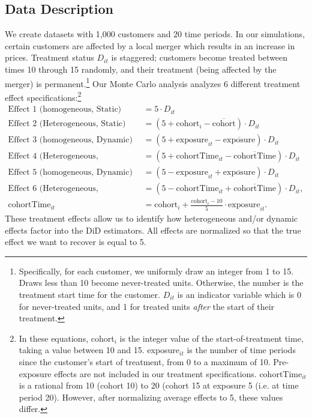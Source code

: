 \documentclass[12pt]{article}
\begin{document}
\subsection{Data Description}
We create datasets with 1,000 customers and 20 time periods. In our simulations, certain customers are affected by a local merger which results in an increase in prices. Treatment status $D_{it}$ is staggered; customers become treated between times 10 through 15 randomly, and their treatment (being affected by the merger) is permanent.\footnote{Specifically, for each customer, we uniformly draw an integer from 1 to 15. Draws less than 10 become never-treated units. Otherwise, the number is the treatment start time for the customer. $D_{it}$ is an indicator variable which is 0 for never-treated units, and 1 for treated units \textit{after} the start of their treatment.} Our Monte Carlo analysis analyzes 6 different treatment effect specifications:\footnote{In these equations, cohort$_i$ is the integer value of the start-of-treatment time, taking a value between 10 and 15. exposure$_{it}$ is the number of time periods since the customer's start of treatment, from 0 to a maximum of 10. Pre-exposure effects are not included in our treatment specifications. cohortTime$_{it}$ is a rational from 10 (cohort 10) to 20 (cohort 15 at exposure 5 (i.e. at time period 20). However, after normalizing average effects to 5, these values differ.}
\begin{align*}
    \text{Effect 1 (homogeneous, Static)} &= 5\cdot D_{it} \\
    \text{Effect 2 (Heterogeneous, Static)} &= (5 + \text{cohort}_i - \overline{\text{cohort}})\cdot D_{it} \\
    \text{Effect 3 (homogeneous, Dynamic)} &= (5 + \text{exposure}_{it} - \overline{\text{exposure}})\cdot D_{it} \\
    \text{Effect 4 (Heterogeneous, Dynamic)} &= (5 + \text{cohortTime}_{it} - \overline{\text{cohortTime}})\cdot D_{it} \\
    \text{Effect 5 (homogeneous, Dynamic)} &= (5 - \text{exposure}_{it} + \overline{\text{exposure}})\cdot D_{it} \\
    \text{Effect 6 (Heterogeneous, Dynamic)} &= (5 - \text{cohortTime}_{it} + \overline{\text{cohortTime}})\cdot D_{it}, \\
    \text{cohortTime}_{it} &= \text{cohort}_i + \frac{\text{cohort}_i-10}{5}\cdot \text{exposure}_{it}.
\end{align*}
These treatment effects allow us to identify how heterogeneous and/or dynamic effects factor into the DiD estimators. All effects are normalized so that the true effect we want to recover is equal to 5.
\end{document}
